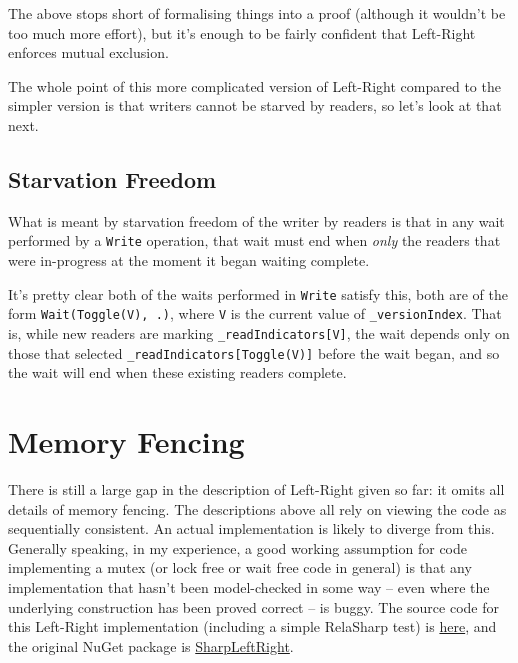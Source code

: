 \documentclass[11pt]{article}
\begin{document}
The above stops short of formalising things into a proof (although it wouldn't be too much more effort), but it's enough to be fairly confident that Left-Right enforces mutual exclusion.

The whole point of this more complicated version of Left-Right compared to the simpler version is that writers cannot be starved by readers, so let's look at that next.

\subsection{Starvation Freedom}

What is meant by starvation freedom of the writer by readers is that in any wait performed by a \texttt{Write} operation, that wait must end when \emph{only} the readers that were in-progress at the moment it began waiting complete.

It's pretty clear both of the waits performed in \texttt{Write} satisfy this, both are of the form \texttt{Wait(Toggle(V), .)}, where \texttt{V} is the current value of \texttt{\_versionIndex}. That is, while new readers are marking \texttt{\_readIndicators[V]}, the wait depends only on those that selected \texttt{\_readIndicators[Toggle(V)]} before the wait began, and so the wait will end when these existing readers complete.

\section{Memory Fencing}

There is still a large gap in the description of Left-Right given so far: it omits all details of memory fencing. The descriptions above all rely on viewing the code as sequentially consistent. An actual implementation is likely to diverge from this. Generally speaking, in my experience, a good working assumption for code implementing a mutex (or lock free or wait free code in general) is that any implementation that hasn't been model-checked in some way -- even where the underlying construction has been proved correct -- is buggy. The source code for this Left-Right implementation (including a simple RelaSharp test) is \href{https://github.com/nicknash/SharpLeftRight}{here}, and the original NuGet package is \href{https://www.nuget.org/packages/SharpLeftRight/1.0.1}{SharpLeftRight}.
\end{document}
